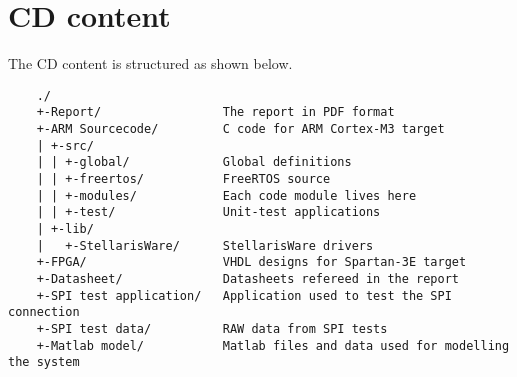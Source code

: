 \chapter{CD content}



The CD content is structured as shown below.

\begin{verbatim}
    ./
    +-Report/                 The report in PDF format
    +-ARM Sourcecode/         C code for ARM Cortex-M3 target
    | +-src/
    | | +-global/             Global definitions
    | | +-freertos/           FreeRTOS source
    | | +-modules/            Each code module lives here
    | | +-test/               Unit-test applications
    | +-lib/
    |   +-StellarisWare/      StellarisWare drivers
    +-FPGA/                   VHDL designs for Spartan-3E target
    +-Datasheet/              Datasheets refereed in the report
    +-SPI test application/   Application used to test the SPI connection
    +-SPI test data/          RAW data from SPI tests
    +-Matlab model/           Matlab files and data used for modelling the system
\end{verbatim}
